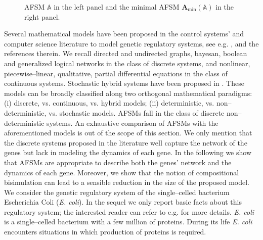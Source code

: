 \documentclass{amsart}
\theoremstyle{definition}
\theoremstyle{remark}
\numberwithin{equation}{section}
\begin{document}
\begin{figure*}[t]
\caption{AFSM $\mathbb{A}$ in the left panel and the minimal AFSM $\mathbf{A}_{\min}(\mathbb{A})$ in the right panel.}
\end{figure*}
Several mathematical models have been proposed in the control systems' and computer science literature to model genetic regulatory systems, see e.g. \cite{BioSurvey}, and the references therein. We recall directed and undirected graphs, bayesan, boolean and generalized logical networks in the class of discrete systems, and nonlinear, piecewise--linear, qualitative, partial differential equations in the class of continuous systems. Stochastic hybrid systems have been proposed in \cite{Julius:08}. These models can be broadly classified along two orthogonal mathematical paradigms: (i) discrete, vs. continuous, vs. hybrid models; (ii) deterministic, vs. non--deterministic, vs. stochastic models. AFSMs fall in the class of discrete non--deterministic systems. An exhaustive comparison of AFSMs with the aforementioned models is out of the scope of this section. We only mention that the discrete systems proposed in the literature well capture the network of the genes but lack in modeling the dynamics of each gene. 
In the following we show that AFSMs are appropriate to describe both the genes' network and the dynamics of each gene. Moreover, we show that the notion of  compositional bisimulation can lead to a sensible reduction in the size of the proposed model. \\
We consider the genetic regulatory system of the single--celled bacterium Escherichia Coli (\textit{E. coli}). In the sequel we only report basic facts about this regulatory system; the interested reader can refer to e.g. \cite{BiocBook,BiocBook1,Alon} for more details. 
\textit{E. coli} is a single--celled bacterium with a few million of proteins. During its life \textit{E. coli} encounters situations in which production of proteins is required. 
\end{document}
